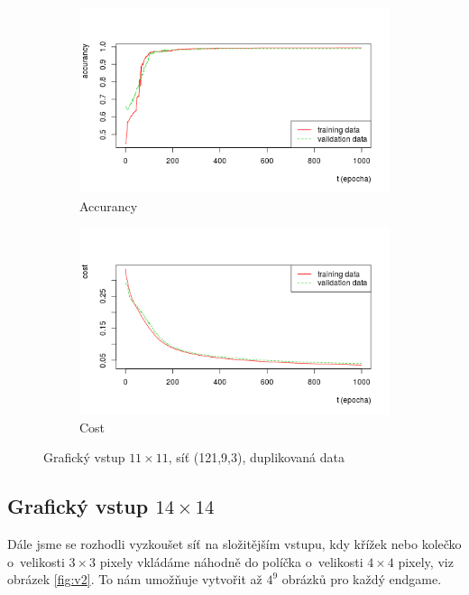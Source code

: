 \documentclass[10pt,a4paper]{article}
\begin{document}
\begin{figure}[h!]
\centering
\begin{subfigure}{.5\textwidth}
  \centering
  \includegraphics[width=\textwidth]{a3}
  \caption{Accurancy}
  \label{fig:a3}
\end{subfigure}%
\begin{subfigure}{.5\textwidth}
  \centering
  \includegraphics[width=\textwidth]{c3}
  \caption{Cost}
  \label{fig:c3}
\end{subfigure}
\caption{Grafický vstup $11\times 11$, síť (121,9,3), duplikovaná data}
\label{fig:3}
\end{figure}

\FloatBarrier
\subsection*{Grafický vstup $14\times 14$}
Dále jsme se rozhodli vyzkoušet síť na složitějším vstupu, kdy křížek nebo kolečko o~velikosti $3\times 3$ pixely vkládáme náhodně do políčka o~velikosti $4\times 4$ pixely, viz obrázek \ref{fig:v2}. To nám umožňuje vytvořit až $4^9$ obrázků pro každý endgame.
\end{document}
